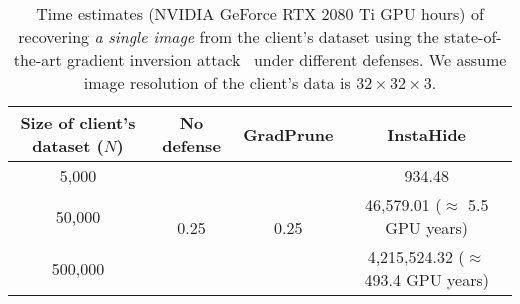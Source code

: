 \begin{table}[t]
    \centering
    \footnotesize
    \setlength{\tabcolsep}{10pt}
    \renewcommand{\arraystretch}{0.95}
    \begin{tabular}{|c|c|c|c|}
    \toprule
    {\bf Size of client's dataset ($N$)} & {\bf No defense} & {\bf GradPrune} & {\bf InstaHide} \\
    \midrule
    5,000 & \multirow{3}{*}{0.25} & \multirow{3}{*}{0.25} & 934.48 \\
    50,000 & & & 46,579.01 ($\approx$ 5.5 GPU years)\\
    500,000 & & & 4,215,524.32 ($\approx$ 493.4 GPU years)\\
    \bottomrule
    \end{tabular}
    \vspace{2mm}
    \caption{Time estimates (NVIDIA GeForce RTX 2080 Ti GPU hours) of recovering {\em a single image} from the client's dataset using the state-of-the-art gradient inversion attack~\citep{geiping2020inverting} under different defenses. We assume image resolution of the client's data is $32\times 32 \times 3$. }
    \label{tab:time_estimate}
    \vspace{-5mm}
\end{table}